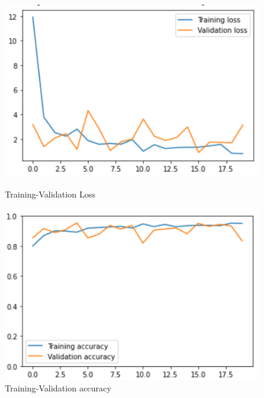\documentclass[11pt,a4paper]{article}
\theoremstyle{definition}
\begin{document}
\begin{figure}[H]
  \centering
  \begin{minipage}[b]{0.45\textwidth}
    \includegraphics[scale=0.75]{./images/v1loss}
	\caption{Training-Validation Loss}
  \end{minipage}
  \hfill
  \begin{minipage}[b]{0.45\textwidth}
    \includegraphics[scale=0.75]{./images/v1acc}
	\caption{Training-Validation accuracy}
  \end{minipage}
\end{figure}
\end{document}
